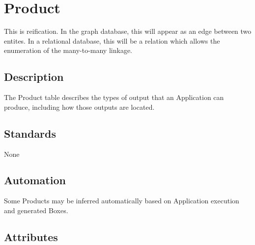 \section{Product}\label{product}

This is reification. In the graph database, this will appear as an edge
between two entites. In a relational database, this will be a relation
which allows the enumeration of the many-to-many linkage.

\subsection{Description}\label{description-24}

The Product table describes the types of output that an Application can
produce, including how those outputs are located.

\subsection{Standards}\label{standards-26}

None

\subsection{Automation}\label{automation-26}

Some Products may be inferred automatically based on Application
execution and generated Boxes.

\subsection{Attributes}\label{attributes-23}

